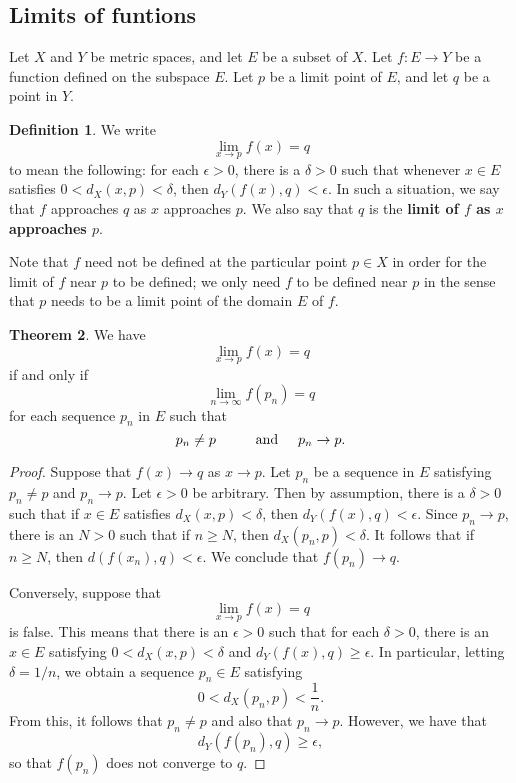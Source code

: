 \documentclass[12pt]{article}
\theoremstyle{definition}
\newtheorem{definition}{Definition}
\theoremstyle{theorem}
\newtheorem{theorem}[definition]{Theorem}
\begin{document}
\subsection{Limits of funtions}

Let $X$ and $Y$ be metric spaces, and let $E$ be a subset of $X$. Let $f : E \to Y$ be a function defined on the subspace $E$. Let $p$ be a limit point of $E$, and let $q$ be a point in $Y$. 

\begin{definition}
We write 
\[
\lim_{x \to p} f(x) = q
\]
to mean the following: for each $\epsilon > 0$, there is a $\delta > 0$ such that whenever $x \in E$ satisfies $0 < d_X(x, p) < \delta$, then $d_Y(f(x),q) < \epsilon$. In such a situation, we say that $f$ approaches $q$ as $x$ approaches $p$. We also say that $q$ is the \textbf{limit of $f$ as $x$ approaches $p$}.
\end{definition}

Note that $f$ need not be defined at the particular point $p \in X$ in order for the limit of $f$ near $p$ to be defined; we only need $f$ to be defined near $p$ in the sense that $p$ needs to be a limit point of the domain $E$ of $f$. 

\begin{theorem}\label{thm:limit}
We have 
\[
\lim_{x \to p} f(x) = q
\]
if and only if 
\[
\lim_{n \to \infty}f(p_n) = q
\]
for each sequence $p_n$ in $E$ such that 
\[
p_n \neq p \hspace{10mm} \text{and} \hspace{5mm} p_n \to p.
\] 
\end{theorem}

\begin{proof}
Suppose that $f(x) \to q$ as $x \to p$. Let $p_n$ be a sequence in $E$ satisfying $p_n \ne p$ and $p_n \to p$. Let $\epsilon > 0$ be arbitrary. Then by assumption, there is a $\delta > 0$ such that if $x \in E$ satisfies $d_X(x,p) < \delta$, then $d_Y(f(x), q) < \epsilon$. Since $p_n \to p$, there is an $N > 0$ such that if $n \geqslant N$, then $d_X(p_n,p) < \delta$. It follows that if $n \geqslant N$, then $d(f(x_n), q) < \epsilon$. We conclude that $f(p_n) \to q$. 

Conversely, suppose that 
\[
\lim_{x \to p}f(x) = q
\]
is false. This means that there is an $\epsilon > 0$ such that for each $\delta > 0$, there is an $x \in E$ satisfying $0 < d_X(x,p) < \delta$ and $d_Y(f(x), q) \geqslant \epsilon$. In particular, letting $\delta = 1/n$, we obtain a sequence $p_n \in E$ satisfying 
\[
0 < d_X(p_n, p) < \frac{1}{n}.
\]
From this, it follows that $p_n \ne p$ and also that $p_n \to p$. However, we have that 
\[
d_Y(f(p_n), q) \geqslant \epsilon,
\]
so that $f(p_n)$ does not converge to $q$. 
\end{proof}
\end{document}
